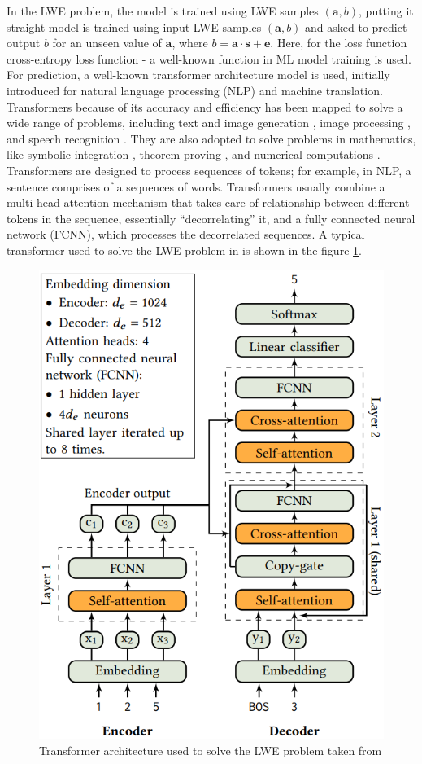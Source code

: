 In the LWE problem, the model is trained using LWE samples $(\textbf{a},b)$, putting it straight model is trained using input LWE samples $(\textbf{a},b)$ and asked to predict output $b$ for an unseen value of $\textbf{a}$, where $b=\textbf{a}\cdot\textbf{s}+\textbf{e}$. Here, for the loss function cross-entropy loss function - a well-known function in ML model training is used. For prediction, a well-known transformer architecture model is used, initially introduced for natural language processing (NLP) and machine translation. Transformers because of its accuracy and efficiency has been mapped to solve a wide range of problems, including text and image generation \cite{carion2020end}, image processing \cite{ramesh2021zero}, and speech recognition \cite{dong2018speech}. They are also adopted to solve problems in mathematics, like symbolic integration \cite{lample2019deep}, theorem proving \cite{polu2020generative}, and numerical computations \cite{charton2021linear}. Transformers are designed to process sequences of tokens; for example, in NLP, a sentence comprises of a sequences of words. Transformers usually combine a multi-head attention mechanism \cite{bahdanau2014neural} that takes care of relationship between different tokens in the sequence, essentially “decorrelating” it, and a fully connected neural network (FCNN), which processes the decorrelated sequences. A typical transformer used to solve the LWE problem in \cite{li2023salsa} is shown in the figure \ref{fig:transfromer_arch}.

\begin{figure}
    \centering
    \includegraphics[width=.4\textwidth, height=.4\textwidth]{ML/Transformer_model.png}
    \caption{Transformer architecture used to solve the LWE problem taken from \cite{wenger2022salsa}}
    \label{fig:transfromer_arch}
\end{figure}

